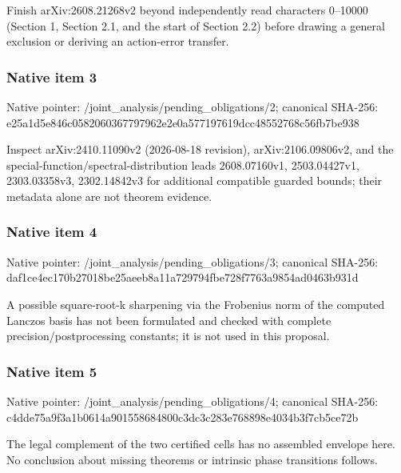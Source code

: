 \documentclass[10pt,a4paper]{article}
\begin{document}
\begingroup\raggedright\sloppy Finish arXiv:\allowbreak{}2608.21268v2 beyond independently read characters 0{\AtlasUnicodeText –}\allowbreak{}10000 (Section 1,\allowbreak{} Section 2.1,\allowbreak{} and the start of Section 2.2) before drawing a general exclusion or deriving an action-error transfer.\par\endgroup

\subsubsection{Native item 3}
Native pointer: /joint\_\allowbreak{}analysis/pending\_\allowbreak{}obligations/2; canonical SHA-256: e25a1d5e846c0582060367797962e2e0a577197619dcc48552768c56fb7be938

\begingroup\raggedright\sloppy Inspect arXiv:\allowbreak{}2410.11090v2 (2026-08-18 revision),\allowbreak{} arXiv:\allowbreak{}2106.09806v2,\allowbreak{} and the special-function/\allowbreak{}spectral-distribution leads 2608.07160v1,\allowbreak{} 2503.04427v1,\allowbreak{} 2303.03358v3,\allowbreak{} 2302.14842v3 for additional compatible guarded bounds;\allowbreak{} their metadata alone are not theorem evidence.\par\endgroup

\subsubsection{Native item 4}
Native pointer: /joint\_\allowbreak{}analysis/pending\_\allowbreak{}obligations/3; canonical SHA-256: daf1ce4ec170b27018be25aeeb8a11a729794fbe728f7763a9854ad0463b931d

\begingroup\raggedright\sloppy A possible square-root-k sharpening via the Frobenius norm of the computed Lanczos basis has not been formulated and checked with complete precision/\allowbreak{}postprocessing constants;\allowbreak{} it is not used in this proposal.\par\endgroup

\subsubsection{Native item 5}
Native pointer: /joint\_\allowbreak{}analysis/pending\_\allowbreak{}obligations/4; canonical SHA-256: c4dde75a9f3a1b0614a901558684800c3dc3c283e768898e4034b3f7cb5ce72b

\begingroup\raggedright\sloppy The legal complement of the two certified cells has no assembled envelope here. No conclusion about missing theorems or intrinsic phase transitions follows.\par\endgroup
\end{document}
